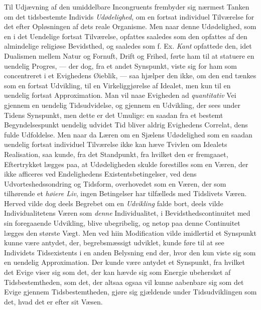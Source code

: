 Til Udjævning af den umiddelbare Incongruents frembyder sig nærmest Tanken om det
tidsbestemte Individs \emph{Udødelighed}, om en fortsat individuel Tilværelse for
det efter Opløsningen af dets reale Organisme. Men naar denne Udødelighed, som en
i det Uendelige fortsat Tilværelse, opfattes saaledes som den opfattes af den
almindelige religiøse Bevidsthed, og saaledes som f. Ex. \emph{Kant} opfattede
den, idet Dualismen mellem Natur og Fornuft, Drift og Frihed, førte ham til at
statuere en uendelig Progres, --- der dog, fra et andet Synspunkt, viste sig for
ham som concentreret i et Evighedens Øieblik, --- saa hjælper den ikke, om den end
tænkes som en fortsat Udvikling, til en Virkeliggjørelse af Idealet, men kun til
en uendelig fortsat Approximation. Man vil naae Evigheden ad \emph{quantitativ}
Vei gjennem en uendelig Tidsudvidelse, og gjennem en Udvikling, der sees under
Tidens Synspunkt, men dette er det Umulige: en saadan fra et bestemt
Begyndelsespunkt uendelig udvidet Tid bliver aldrig Evighedens Correlat, dens
fulde Udfoldelse. Men naar da Læren om en Sjælens Udødelighed som en saadan
uendelig fortsat individuel Tilværelse ikke kan hæve Tvivlen om Idealets
Realisation, saa kunde, fra det Standpunkt, fra hvilket den er fremgaaet,
Eftertrykket lægges paa, at Udødeligheden skulde forestilles som en Væren, der
ikke afficeres ved Endelighedens Existentsbetingelser, ved dens
Udvorteshedssondring og Tidsform, overhovedet som en Væren, der som tilhørende et
\emph{høiere Liv}, ingen Betingelser har tilfælleds med Tidslivets Væren. Herved
vilde dog deels Begrebet om en \emph{Udvikling} falde bort, deels vilde
Individualitetens Væren som \emph{denne} Individualitet, i Bevidsthedscontinuitet
med sin foregaaende Udvikling, blive ubegribelig, og netop paa denne Continuitet
lægges den største Vægt. Men ved hiin Modification vilde imidlertid et Synspunkt
kunne være antydet, der, begrebsmæssigt udviklet, kunde føre til at see Individets
Tidsexistents i en anden Belysning end der, hvor den kun viste sig som en uendelig
Approximation.
 Der kunde være antydet et Synspunkt, fra hvilket det Evige viser sig som det, der
kan hævde sig som Energie ubehersket af Tidsbestemtheden, som det, der altsaa
ogsaa vil kunne aabenbare sig som det Evige gjennem Tidsbestemtheden, gjøre sig
gjældende under Tidsudviklingen som det, hvad det er efter sit Væsen.

